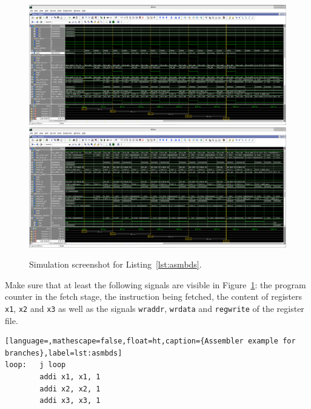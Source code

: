 \begin{figure}[ht!]
  \centering
  \includegraphics[width=1.0\linewidth]{img/branching1.png}
  \includegraphics[width=1.0\linewidth]{img/branching2.png}
  \caption{Simulation screenshot for Listing~\ref{lst:asmbds}.}
  \label{fig:sim2}
\end{figure}

Make sure that at least the following signals are visible in
Figure~\ref{fig:sim2}: the program counter in the fetch stage, the
instruction being fetched, the content of registers \texttt{x1}, 
\texttt{x2} and \texttt{x3} as well as the signals \texttt{wraddr},
\texttt{wrdata} and \texttt{regwrite} of the register file.

\begin{lstlisting}[language=,mathescape=false,float=ht,caption={Assembler example for branches},label=lst:asmbds]
loop:   j loop
        addi x1, x1, 1
        addi x2, x2, 1
        addi x3, x3, 1
\end{lstlisting}

